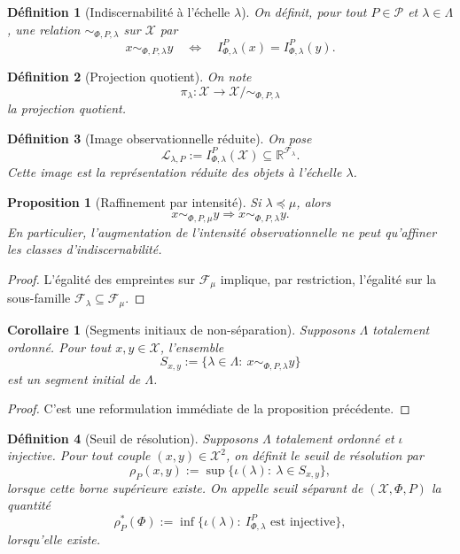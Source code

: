 \documentclass[11pt,a4paper]{article}
\newtheorem{definition}{Définition}
\newtheorem{proposition}{Proposition}
\newtheorem{corollary}{Corollaire}
\begin{document}
\begin{definition}[Indiscernabilité à l'échelle \(\lambda\)]
On définit, pour tout \(P\in\mathcal P\) et \(\lambda\in\Lambda\), une relation \(\sim_{\Phi,P,\lambda}\) sur \(\mathcal X\) par
\[
x\sim_{\Phi,P,\lambda}y
\quad\Longleftrightarrow\quad
I_{\Phi,\lambda}^P(x)=I_{\Phi,\lambda}^P(y).
\]
\end{definition}

\begin{definition}[Projection quotient]
On note
\[
\pi_\lambda:\mathcal X\longrightarrow \mathcal X/{\sim_{\Phi,P,\lambda}}
\]
la projection quotient.
\end{definition}

\begin{definition}[Image observationnelle réduite]
On pose
\[
\mathcal L_{\lambda,P}:=I_{\Phi,\lambda}^P(\mathcal X)\subseteq \mathbb R^{\mathcal F_\lambda}.
\]
Cette image est la représentation réduite des objets à l'échelle \(\lambda\).
\end{definition}

\begin{proposition}[Raffinement par intensité]
Si \(\lambda\preceq\mu\), alors
\[
x\sim_{\Phi,P,\mu}y \Longrightarrow x\sim_{\Phi,P,\lambda}y.
\]
En particulier, l'augmentation de l'intensité observationnelle ne peut qu'affiner les classes d'indiscernabilité.
\end{proposition}

\begin{proof}
L'égalité des empreintes sur \(\mathcal F_\mu\) implique, par restriction, l'égalité sur la sous-famille \(\mathcal F_\lambda\subseteq\mathcal F_\mu\).
\end{proof}

\begin{corollary}[Segments initiaux de non-séparation]
Supposons \(\Lambda\) totalement ordonné. Pour tout \(x,y\in\mathcal X\), l'ensemble
\[
S_{x,y}:=\{\lambda\in\Lambda:\ x\sim_{\Phi,P,\lambda}y\}
\]
est un segment initial de \(\Lambda\).
\end{corollary}

\begin{proof}
C'est une reformulation immédiate de la proposition précédente.
\end{proof}

\begin{definition}[Seuil de résolution]
Supposons \(\Lambda\) totalement ordonné et \(\iota\) injective. Pour tout couple \((x,y)\in\mathcal X^2\), on définit le seuil de résolution par
\[
\rho_P(x,y):=\sup\{\iota(\lambda):\ \lambda\in S_{x,y}\},
\]
lorsque cette borne supérieure existe. On appelle \emph{seuil séparant} de \((\mathcal X,\Phi,P)\) la quantité
\[
\rho_P^\ast(\Phi):=\inf\{\iota(\lambda):\ I_{\Phi,\lambda}^P \text{ est injective}\},
\]
lorsqu'elle existe.
\end{definition}
\end{document}
